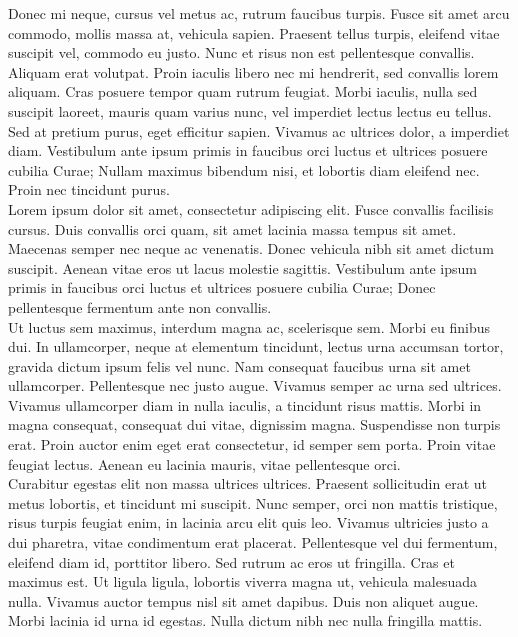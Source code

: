 Donec mi neque, cursus vel metus ac, rutrum faucibus turpis. Fusce sit amet arcu commodo, mollis massa at, vehicula sapien. Praesent tellus turpis, eleifend vitae suscipit vel, commodo eu justo. Nunc et risus non est pellentesque convallis. Aliquam erat volutpat. Proin iaculis libero nec mi hendrerit, sed convallis lorem aliquam. Cras posuere tempor quam rutrum feugiat. Morbi iaculis, nulla sed suscipit laoreet, mauris quam varius nunc, vel imperdiet lectus lectus eu tellus. Sed at pretium purus, eget efficitur sapien. Vivamus ac ultrices dolor, a imperdiet diam. Vestibulum ante ipsum primis in faucibus orci luctus et ultrices posuere cubilia Curae; Nullam maximus bibendum nisi, et lobortis diam eleifend nec. Proin nec tincidunt purus.
\\


Lorem ipsum dolor sit amet, consectetur adipiscing elit. Fusce convallis facilisis cursus. Duis convallis orci quam, sit amet lacinia massa tempus sit amet. Maecenas semper nec neque ac venenatis. Donec vehicula nibh sit amet dictum suscipit. Aenean vitae eros ut lacus molestie sagittis. Vestibulum ante ipsum primis in faucibus orci luctus et ultrices posuere cubilia Curae; Donec pellentesque fermentum ante non convallis.
\\

Ut luctus sem maximus, interdum magna ac, scelerisque sem. Morbi eu finibus dui. In ullamcorper, neque at elementum tincidunt, lectus urna accumsan tortor, gravida dictum ipsum felis vel nunc. Nam consequat faucibus urna sit amet ullamcorper. Pellentesque nec justo augue. Vivamus semper ac urna sed ultrices. Vivamus ullamcorper diam in nulla iaculis, a tincidunt risus mattis. Morbi in magna consequat, consequat dui vitae, dignissim magna. Suspendisse non turpis erat. Proin auctor enim eget erat consectetur, id semper sem porta. Proin vitae feugiat lectus. Aenean eu lacinia mauris, vitae pellentesque orci.
\\

Curabitur egestas elit non massa ultrices ultrices. Praesent sollicitudin erat ut metus lobortis, et tincidunt mi suscipit. Nunc semper, orci non mattis tristique, risus turpis feugiat enim, in lacinia arcu elit quis leo. Vivamus ultricies justo a dui pharetra, vitae condimentum erat placerat. Pellentesque vel dui fermentum, eleifend diam id, porttitor libero. Sed rutrum ac eros ut fringilla. Cras et maximus est. Ut ligula ligula, lobortis viverra magna ut, vehicula malesuada nulla. Vivamus auctor tempus nisl sit amet dapibus. Duis non aliquet augue. Morbi lacinia id urna id egestas. Nulla dictum nibh nec nulla fringilla mattis.
\\

